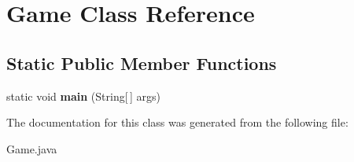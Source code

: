 \hypertarget{class_game}{\section{Game Class Reference}
\label{class_game}
}
\subsection*{Static Public Member Functions}
\begin{DoxyCompactItemize}
\item 
\hypertarget{class_game_ae52595a27ac1b327b05db2129ad81fca}{static void {\bfseries main} (String\mbox{[}$\,$\mbox{]} args)}\label{class_game_ae52595a27ac1b327b05db2129ad81fca}

\end{DoxyCompactItemize}


The documentation for this class was generated from the following file\-:\begin{DoxyCompactItemize}
\item 
Game.\-java\end{DoxyCompactItemize}
